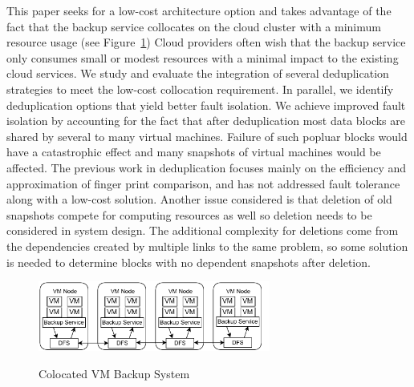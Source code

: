 This paper seeks for a low-cost architecture option and takes advantage of the
fact that the
backup service collocates on the cloud cluster with a minimum resource usage (see Figure~\ref{fig:colocated-arch})
Cloud providers often wish that the backup service only consumes  small or modest resources
with a minimal impact to the existing cloud services.  
We study and evaluate the integration of several deduplication strategies to meet
the low-cost collocation requirement. In parallel, we identify deduplication options that yield
better fault isolation.
We achieve improved fault isolation by accounting for the fact that after
deduplication most data blocks are shared by several to many virtual machines.
Failure of such popluar blocks would have a catastrophic effect and many
snapshots of virtual machines would be affected.
The previous work in deduplication focuses mainly on the efficiency and approximation of
finger print comparison, and has not addressed fault tolerance along with a low-cost solution.
Another issue considered is that
deletion of old snapshots compete for computing resources as well so deletion needs
to be considered in system design. The additional complexity for deletions
come from the dependencies created by multiple links to the same problem, so
some solution is needed to determine blocks with no dependent snapshots after deletion.

\begin{figure}[htb]
    \centering
    \includegraphics[width=3in]{images/colocated-arch.pdf}
    \label{fig:colocated-arch}
    \caption{Colocated VM Backup System}
\end{figure}

